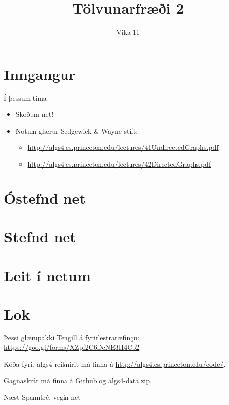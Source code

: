 \documentclass{beamer}
\title{Tölvunarfræði 2}
\subtitle{Vika 11}
\begin{document}
\begin{frame}
\titlepage
\end{frame}

\section{Inngangur}

\begin{frame}{Í þessum tíma}
\begin{itemize}
 \item Skoðum net!
 \item Notum glærur Sedgewick \& Wayne stíft:
 \begin{itemize}
  \item \url{http://algs4.cs.princeton.edu/lectures/41UndirectedGraphs.pdf}
  \item \url{http://algs4.cs.princeton.edu/lectures/42DirectedGraphs.pdf}
 \end{itemize}
\end{itemize}
\end{frame}

\section{Óstefnd net}

\section{Stefnd net}

\section{Leit í netum}

\section{Lok}

\begin{frame}{Þessi glærupakki}
Tengill á fyrirlestraræfingu: \url{https://goo.gl/forms/XZpf2C6DcNE3H4Cb2}
\vspace{1cm}

Kóða fyrir algs4 reiknirit má finna á \url{http://algs4.cs.princeton.edu/code/}.

Gagnaskrár má finna á \href{https://github.com/Ernir/kennsluefni/tree/master/T2/Code/w10}{Github} og algs4-data.zip.
\end{frame}

\begin{frame}{Næst}
Spanntré, vegin net
\end{frame}
\end{document}
